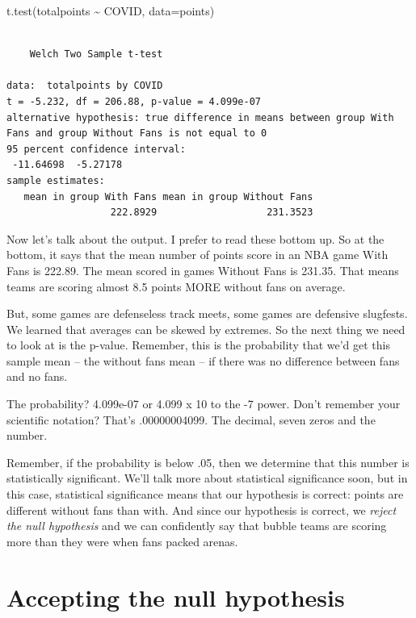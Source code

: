 \documentclass[
  letterpaper,
  DIV=11,
  numbers=noendperiod]{scrreprt}
\newenvironment{Shaded}{\begin{snugshade}}{\end{snugshade}}
\newcommand{\AttributeTok}[1]{\textcolor[rgb]{0.40,0.45,0.13}{#1}}
\newcommand{\FunctionTok}[1]{\textcolor[rgb]{0.28,0.35,0.67}{#1}}
\newcommand{\NormalTok}[1]{\textcolor[rgb]{0.00,0.23,0.31}{#1}}
\newcommand{\SpecialCharTok}[1]{\textcolor[rgb]{0.37,0.37,0.37}{#1}}
\begin{document}
\begin{Shaded}
\begin{Highlighting}[]
\FunctionTok{t.test}\NormalTok{(totalpoints }\SpecialCharTok{\textasciitilde{}}\NormalTok{ COVID, }\AttributeTok{data=}\NormalTok{points)}
\end{Highlighting}
\end{Shaded}

\begin{verbatim}

    Welch Two Sample t-test

data:  totalpoints by COVID
t = -5.232, df = 206.88, p-value = 4.099e-07
alternative hypothesis: true difference in means between group With Fans and group Without Fans is not equal to 0
95 percent confidence interval:
 -11.64698  -5.27178
sample estimates:
   mean in group With Fans mean in group Without Fans 
                  222.8929                   231.3523 
\end{verbatim}

Now let's talk about the output. I prefer to read these bottom up. So at
the bottom, it says that the mean number of points score in an NBA game
With Fans is 222.89. The mean scored in games Without Fans is 231.35.
That means teams are scoring almost 8.5 points MORE without fans on
average.

But, some games are defenseless track meets, some games are defensive
slugfests. We learned that averages can be skewed by extremes. So the
next thing we need to look at is the p-value. Remember, this is the
probability that we'd get this sample mean -- the without fans mean --
if there was no difference between fans and no fans.

The probability? 4.099e-07 or 4.099 x 10 to the -7 power. Don't remember
your scientific notation? That's .00000004099. The decimal, seven zeros
and the number.

Remember, if the probability is below .05, then we determine that this
number is statistically significant. We'll talk more about statistical
significance soon, but in this case, statistical significance means that
our hypothesis is correct: points are different without fans than with.
And since our hypothesis is correct, we \emph{reject the null
hypothesis} and we can confidently say that bubble teams are scoring
more than they were when fans packed arenas.

\hypertarget{accepting-the-null-hypothesis}{%
\section{Accepting the null
hypothesis}\label{accepting-the-null-hypothesis}}
\end{document}

